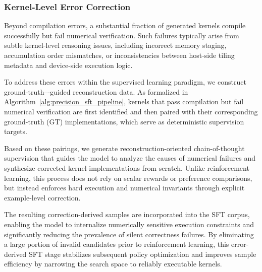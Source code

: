

\subsubsection{Kernel-Level Error Correction}\label{sft_kernel_correction}


Beyond compilation errors, a substantial fraction of generated kernels compile successfully but fail numerical verification. Such failures typically arise from subtle kernel-level reasoning issues, including incorrect memory staging, accumulation order mismatches, or inconsistencies between host-side tiling metadata and device-side execution logic.

To address these errors within the supervised learning paradigm, we construct ground-truth–-guided reconstruction data. As formalized in Algorithm~\ref{alg:precision_sft_pipeline}, kernels that pass compilation but fail numerical verification are first identified and then paired with their corresponding ground-truth (GT) implementations, which serve as deterministic supervision targets.

Based on these pairings, we generate reconstruction-oriented chain-of-thought supervision that guides the model to analyze the causes of numerical failures and synthesize corrected kernel implementations from scratch. Unlike reinforcement learning, this process does not rely on scalar rewards or preference comparisons, but instead enforces hard execution and numerical invariants through explicit example-level correction.

The resulting correction-derived samples are incorporated into the SFT corpus, enabling the model to internalize numerically sensitive execution constraints and significantly reducing the prevalence of silent correctness failures. By eliminating a large portion of invalid candidates prior to reinforcement learning, this error-derived SFT stage stabilizes subsequent policy optimization and improves sample efficiency by narrowing the search space to reliably executable kernels.


